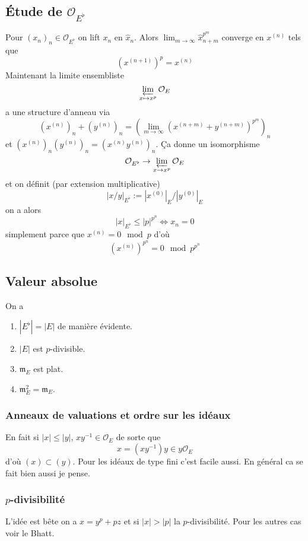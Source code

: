 \documentclass[a4paper,12pt]{article}
\newcommand{\Or}{\mathcal{O}}
\newcommand{\m}{\mathfrak m}
\theoremstyle{plain}
\theoremstyle{definition}
\theoremstyle{remark}
\begin{document}
\subsection{Étude de $\Or_{E^\flat}$}
Pour $(x_n)_n\in \Or_{E^\flat}$ on lift $x_n$ en $\widehat x_n$.
Alors $\lim_{m\to \infty} \widehat x_{n+m}^{p^m}$ converge en
$x^{(n)}$ tels que 
\[(x^{(n+1)})^p=x^{(n)}\]
Maintenant la limite ensembliste
\[\varprojlim_{x\mapsto x^p}\Or_E\]
a une structure d'anneau via \[(x^{(n)})_n+(y^{(n)})_n=(\lim_{m\to\infty} (x^{(n+m)}+y^{(n+m)})^{p^m})_n\]
et $(x^{(n)})_n(y^{(n)})_n=(x^{(n)}y^{(n)})_n$. Ça donne
un isomorphisme
\[\Or_{E^\flat}\to \varprojlim_{x\to x^p}\Or_E\]
et on définit (par extension multiplicative)
\[|x/y|_{E^\flat}:=|x^{(0)}|_E/|y^{(0)}|_E\]
on a alors
\[|x|_{E^\flat}\leq |p|^{p^n}\Leftrightarrow x_n=0\]
simplement parce que $x^{(n)}=0\mod p$ d'où
\[(x^{(n)})^{p^n}=0\mod p^{p^n}\]

\subsection{Valeur absolue}
On a 
\begin{enumerate}
    \item $|E^\flat|=|E|$ de manière évidente.
    \item $|E|$ est $p$-divisible.
    \item $\m_E$ est plat.
    \item $\m_E^2=\m_E$.
\end{enumerate}
\subsubsection{Anneaux de valuations et ordre sur les idéaux}
En fait si $|x|\leq |y|$, $xy^{-1}\in\Or_{E}$ de sorte que 
\[x=(xy^{-1})y\in y\Or_E\]
d'où $(x)\subset (y)$. Pour les idéaux de type fini c'est facile
aussi. En général ca se fait bien aussi je pense. 

\subsubsection{$p$-divisibilité}
L'idée est bête on a $x=y^p+pz$ et si $|x|>|p|$ la 
$p$-divisibilité. Pour les autres cas voir le Bhatt.
\end{document}
